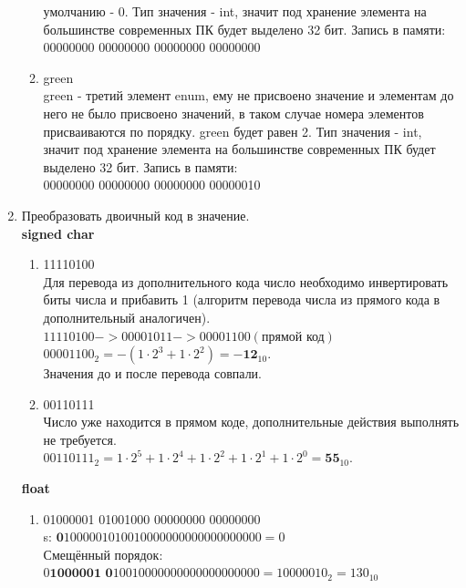 \documentclass[a4paper,14pt]{extarticle}
\begin{document}
\begin{enumerate}
\begin{enumerate}[1. ]
		            умолчанию - 0. Тип значения - int, значит под хранение элемента на большинстве современных ПК будет выделено 32 бит.
		            Запись в памяти:\\
		            00000000 00000000 00000000 00000000
		      \item green\\
		            green - третий элемент enum, ему не присвоено значение и элементам до него не было присвоено значений, в таком случае номера элементов присваиваются по порядку.
		            green будет равен 2. Тип значения - int, значит под хранение элемента на большинстве современных ПК будет выделено 32 бит.
		            Запись в памяти:\\
		            00000000 00000000 00000000 00000010
	      \end{enumerate}
	\item Преобразовать двоичный код в значение.\\
	      \textbf{signed char}
	      \begin{enumerate}[1. ]
		      \item 11110100\\
		            Для перевода из дополнительного кода число необходимо инвертировать биты числа и прибавить 1 (алгоритм перевода числа из прямого кода в дополнительный аналогичен).\\
		            $11110100 -> 00001011 -> 00001100 (\text{прямой код})$\\
		            $00001100_2 = -(1 \cdot 2 ^ 3 + 1 \cdot 2 ^ 2) = -\textbf{12}_{10}$.\\
		            Значения до и после перевода совпали.
		      \item 00110111\\
		            Число уже находится в прямом коде, дополнительные действия выполнять не требуется.\\
		            $00110111_2 = 1 \cdot 2 ^ 5 + 1 \cdot 2 ^ 4 + 1 \cdot 2 ^ 2 + 1 \cdot 2 ^ 1 + 1 \cdot 2 ^ 0 = \textbf{55}_{10}$.\\
	      \end{enumerate}
	      \textbf{float}
	      \begin{enumerate}[1. ]
		      \item 01000001 01001000 00000000 00000000\\
		            s: $\textbf{0}1000001 01001000 00000000 00000000 = 0$\\
		            Смещённый порядок: $0\textbf{1000001 0}1001000 00000000 00000000 = 10000010_2 = 130_{10}$\\

\end{enumerate}
\end{enumerate}
\end{document}
